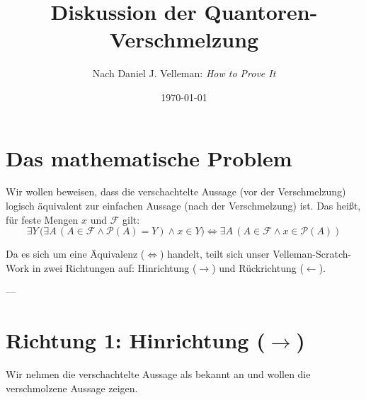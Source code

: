 \documentclass{article}
\title{Diskussion der Quantoren-Verschmelzung}
\author{Nach Daniel J. Velleman: \emph{How to Prove It}}
\date{\today}
\begin{document}
\maketitle

\section*{Das mathematische Problem}

Wir wollen beweisen, dass die verschachtelte Aussage (vor der Verschmelzung) logisch äquivalent zur einfachen Aussage (nach der Verschmelzung) ist. Das heißt, für feste Mengen $x$ und $\mathcal{F}$ gilt:
\[
\exists Y \, \Big( \exists A \, (A \in \mathcal{F} \land \mathcal{P}(A) = Y) \land x \in Y \Big)
\iff
\exists A \, (A \in \mathcal{F} \land x \in \mathcal{P}(A))
\]

Da es sich um eine Äquivalenz ($\iff$) handelt, teilt sich unser Velleman-Scratch-Work in zwei Richtungen auf: Hinrichtung ($\rightarrow$) und Rückrichtung ($\leftarrow$).

---

\section*{Richtung 1: Hinrichtung ($\rightarrow$)}
Wir nehmen die verschachtelte Aussage als bekannt an und wollen die verschmolzene Aussage zeigen.
\end{document}
